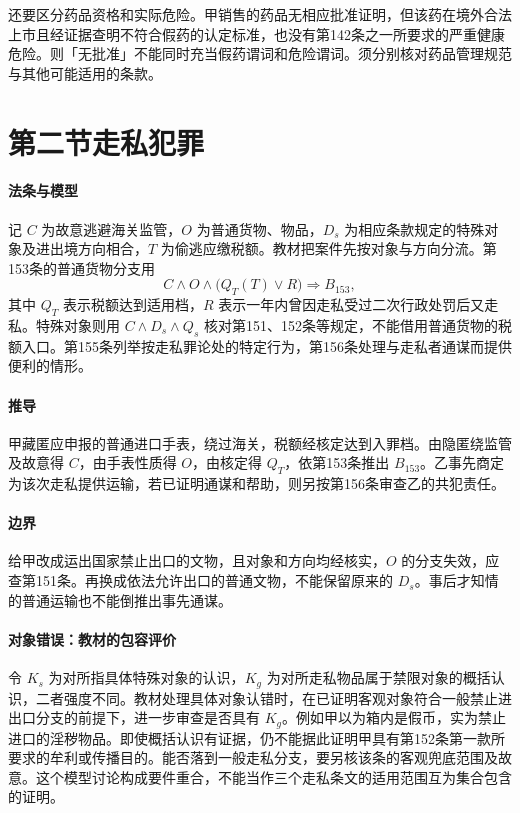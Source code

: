 还要区分药品资格和实际危险。甲销售的药品无相应批准证明，但该药在境外合法上市且经证据查明不符合假药的认定标准，也没有第142条之一所要求的严重健康危险。则「无批准」不能同时充当假药谓词和危险谓词。须分别核对药品管理规范与其他可能适用的条款。

\section{第二节\quad 走私犯罪}

\paragraph{法条与模型}
记 \(C\) 为故意逃避海关监管，\(O\) 为普通货物、物品，\(D_s\) 为相应条款规定的特殊对象及进出境方向相合，\(T\) 为偷逃应缴税额。教材把案件先按对象与方向分流。第153条的普通货物分支用
\[
C\land O\land\bigl(Q_T(T)\lor R\bigr)\Longrightarrow B_{153},
\]
其中 \(Q_T\) 表示税额达到适用档，\(R\) 表示一年内曾因走私受过二次行政处罚后又走私。特殊对象则用 \(C\land D_s\land Q_s\) 核对第151、152条等规定，不能借用普通货物的税额入口。第155条列举按走私罪论处的特定行为，第156条处理与走私者通谋而提供便利的情形。

\paragraph{推导}
甲藏匿应申报的普通进口手表，绕过海关，税额经核定达到入罪档。由隐匿绕监管及故意得 \(C\)，由手表性质得 \(O\)，由核定得 \(Q_T\)，依第153条推出 \(B_{153}\)。乙事先商定为该次走私提供运输，若已证明通谋和帮助，则另按第156条审查乙的共犯责任。

\paragraph{边界}
给甲改成运出国家禁止出口的文物，且对象和方向均经核实，\(O\) 的分支失效，应查第151条。再换成依法允许出口的普通文物，不能保留原来的 \(D_s\)。事后才知情的普通运输也不能倒推出事先通谋。

\paragraph{对象错误：教材的包容评价}
令 \(K_s\) 为对所指具体特殊对象的认识，\(K_g\) 为对所走私物品属于禁限对象的概括认识，二者强度不同。教材处理具体对象认错时，在已证明客观对象符合一般禁止进出口分支的前提下，进一步审查是否具有 \(K_g\)。例如甲以为箱内是假币，实为禁止进口的淫秽物品。即使概括认识有证据，仍不能据此证明甲具有第152条第一款所要求的牟利或传播目的。能否落到一般走私分支，要另核该条的客观兜底范围及故意。这个模型讨论构成要件重合，不能当作三个走私条文的适用范围互为集合包含的证明。

